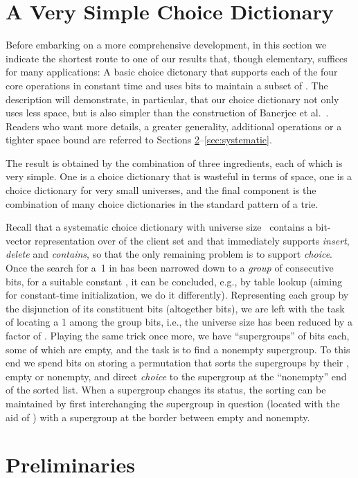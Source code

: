 \documentclass[envcountsame,envcountsect,undated,nolinenumbers]{lnthi}
\def\Tvn#1{\hbox{\textit{#1\/}}}
\begin{document}
\section{A Very Simple Choice Dictionary}
\label{sec:quick}Before embarking on a more
comprehensive
development, in this section
we indicate the shortest route to one of
our results that, though elementary,
suffices for many applications:
A basic choice dictonary that supports each
of the four core operations in constant time
and uses  bits to
maintain a subset of .
The description will demonstrate, in particular,
that our choice dictionary not only uses less
space, but is also simpler than the construction
of Banerjee et al.~\cite{BanCR16}.
Readers who want more details, a greater generality,
additional operations or a tighter space bound
are referred to Sections
\ref{sec:preliminaries}--\ref{sec:systematic}.

The result is
obtained by the combination of three ingredients,
each of which is very simple.
One is a choice dictionary that is wasteful in terms
of space, one is a choice
dictionary for very small universes, and the final component is 
the combination of many choice dictionaries
in the standard pattern of a trie.

Recall that a systematic choice dictionary with
universe size~ contains a bit-vector representation
 over  of the client set
and that  immediately supports \Tvn{insert},
\Tvn{delete} and \Tvn{contains}, so that the only
remaining problem is to support \Tvn{choice}.
Once the search for a~1 in  has been narrowed
down to a \emph{group} of  consecutive bits, for
a suitable constant , it
can be concluded, e.g., by table lookup
(aiming for constant-time initialization,
we do it differently).
Representing each group by the disjunction of its
constituent bits (altogether
 bits),
we are left with the task of locating
a 1 among the group bits, i.e., the universe size
has been reduced by a factor of .
Playing the same trick once more, we have
``supergroups'' of  bits each,
some of which are empty, and the task is to find
a nonempty supergroup.
To this end we spend  bits
on storing a permutation  that sorts the
supergroups by their ,
empty or nonempty, and direct \Tvn{choice} to
the supergroup at the ``nonempty'' end of the sorted list.
When a supergroup changes its status, the sorting
can be maintained by first interchanging the
supergroup in question (located with the aid of )
with a supergroup at the border between
empty and nonempty.

\section{Preliminaries}
\label{sec:preliminaries}
\end{document}
